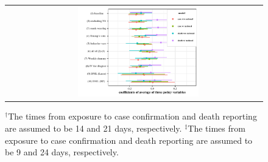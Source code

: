 \documentclass[11pt,reqno,letter]{amsart}
\theoremstyle{definition}
\begin{document}
\begin{figure}[ht]
\begin{minipage}{\linewidth}
\begin{tabular}{cc}
      &
      \includegraphics[width=0.5\textwidth]{tables_and_figures/pindex-whisker-7}
          \end{tabular}
  \end{minipage}   
    \begin{flushleft}
      \footnotesize
      $^\dagger$The times from exposure to case confirmation and death reporting  are assumed to be 14 and 21 days, respectively. $^\ddagger$The times from exposure to case confirmation and death reporting  are assumed to be 9 and 24 days, respectively. 
    \end{flushleft}
\end{figure}
   
\end{document}
